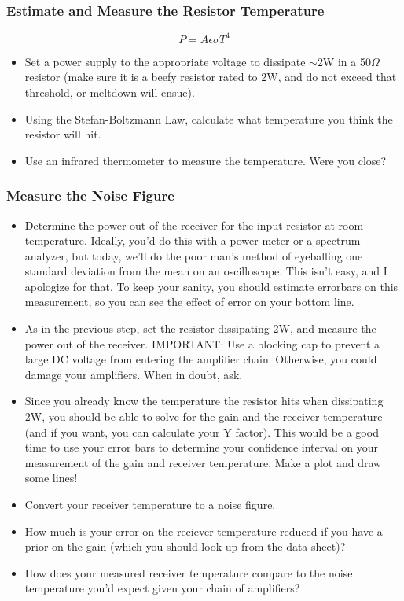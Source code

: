 \documentclass[11pt]{article}
\begin{document}
\subsubsection*{Estimate and Measure the Resistor Temperature}
\begin{equation}
P=A\epsilon \sigma T^4
\end{equation}
\begin{itemize}
\item Set a power supply to the appropriate voltage to dissipate $\sim$2W in a 50$\Omega$ resistor (make
sure it is a beefy resistor rated to 2W, and do not exceed that threshold, or meltdown will ensue).
\item Using the Stefan-Boltzmann Law, calculate what temperature you think the resistor will hit.
\item Use an infrared thermometer to measure the temperature.  Were you close?
\end{itemize}

\subsubsection*{Measure the Noise Figure}
\begin{itemize}
\item Determine the power out of the receiver for the input resistor at room temperature.  Ideally, you'd do this
with a power meter or a spectrum analyzer, but today, we'll do the poor man's method of eyeballing one
standard deviation from the mean on an oscilloscope.  This isn't easy, and I apologize for that.  To keep your
sanity, you should estimate errorbars on this measurement, so you can see the effect of error on
your bottom line.
\item As in the previous step, set the resistor dissipating 2W, and measure the power out of the receiver.
IMPORTANT: Use a blocking cap to prevent a large DC voltage from entering the amplifier chain.  Otherwise, you
could damage your amplifiers.  When in doubt, ask.
\item Since you already know the temperature the resistor hits when dissipating 2W, you should be able to
solve for the gain and the receiver temperature (and if you want, you can calculate your Y factor).  This
would be a good time to use your error bars to determine your confidence interval on your measurement
of the gain and receiver temperature.  Make a plot and draw some lines!
\item Convert your receiver temperature to a noise figure.
\item How much is your error on the reciever temperature reduced if you have a prior on the gain (which
you should look up from the data sheet)?
\item How does your measured receiver temperature compare to the noise temperature you'd expect given
your chain of amplifiers? 
\end{itemize}
\end{document}
